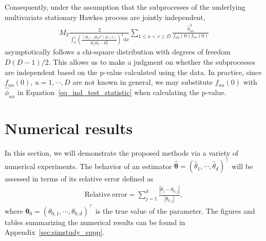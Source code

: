 \documentclass[11pt]{article}
\numberwithin{equation}{section}
\theoremstyle{plain}
\theoremstyle{definition}
\theoremstyle{definition}
\theoremstyle{assumption}
\theoremstyle{proposition}
\theoremstyle{proposition}
\theoremstyle{example}
\theoremstyle{lemma}
\theoremstyle{theorem}
\theoremstyle{remark}
\begin{document}
Consequently, under the assumption that the subprocesses of the underlying multivariate stationary Hawkes process are jointly independent, 
\begin{align}\label{eq_ind_test_statistic}
M_T\frac{2}{\int_{0}^{1} \left(\frac{(H_4 - H_2 x^2)K(x)}{H_4H_0 - H_2^2}\right)^2\mathrm{d}x}\sum_{1\leqslant u<v\leqslant D}\frac{\hat{\phi}_{uv}^2}{f_{uu}(0)f_{vv}(0)}    
\end{align}
asymptotically follows a chi-square distribution with degrees of freedom $D(D-1)/2$. This allows us to make a judgment on whether the subprocesses are independent based on the p-value calculated using the data. In practice, since $f_{uu}(0)$, $u=1,\cdots,D$ are not known in general, we may substitute $f_{uu}(0)$ with $\hat{\phi}_{uu}$ in Equation~\eqref{eq_ind_test_statistic} when calculating the p-value.



\section{Numerical results}\label{section_numerical_experiment}
In this section, we will demonstrate the proposed methods via a variety of numerical experiments. The behavior of an estimator $\hat{\boldsymbol{\theta}} = (\hat{\theta}_1,\cdots,\hat{\theta}_d)^{\top}$ will be assessed in terms of its relative error defined as
\begin{align}\label{def_relative_error}
\mathrm{Relative~error}=\sum_{j=1}^d \frac{|\hat{\theta}_j - \theta_{0,j}|}{|\theta_{0,j}|},    
\end{align}
where $\boldsymbol{\theta}_0= (\theta_{0,1},\cdots,\theta_{0,d})^{\top}$ is the true value of the parameter. The figures and tables summarizing the numerical results can be found in Appendix~\ref{sec:simstudy_supp}. %
\end{document}
